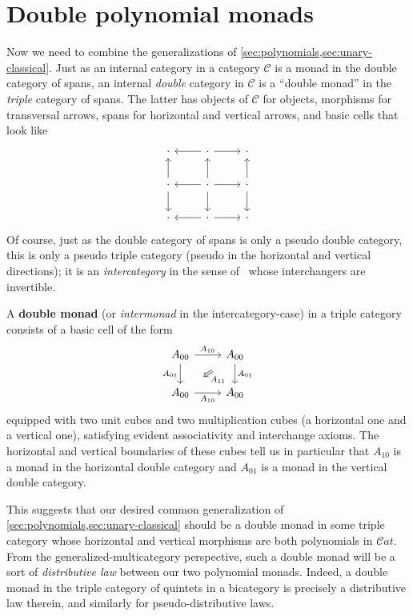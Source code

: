 \documentclass{article}
\theoremstyle{definition}
\theoremstyle{remark}
\def\Cat{\mathcal{C}\mathit{at}}
\def\sC{\mathscr{C}}
\def\twocell#1#2#3{\ar[from=#1,to=#2,phantom,""{name=1,near start},""{name=2,near end}]\ar[Rightarrow,from=1,to=2,"#3"]}
\def\drtwocell{\twocell{r}{d}}
\begin{document}
\section{Double polynomial monads}
\label{sec:double-polynomials}

Now we need to combine the generalizations of \cref{sec:polynomials,sec:unary-classical}.
Just as an internal category in a category $\sC$ is a monad in the double category of spans, an internal \emph{double} category in $\sC$ is a ``double monad'' in the \emph{triple} category of spans.
The latter has objects of $\sC$ for objects, morphisms for transversal arrows, spans for horizontal and vertical arrows, and basic cells that look like
\[
\begin{tikzcd}
  \cdot & \cdot \ar[l] \ar[r] & \cdot \\
  \cdot \ar[u] \ar[d] & \cdot \ar[u] \ar[d] \ar[r] \ar[l] & \cdot \ar[u] \ar[d]\\
  \cdot & \cdot \ar[l] \ar[r] & \cdot
\end{tikzcd}
\]
Of course, just as the double category of spans is only a pseudo double category, this is only a pseudo triple category (pseudo in the horizontal and vertical directions); it is an \emph{intercategory} in the sense of~\cite{gp:intercategories-i,gp:intercategories-ii} whose interchangers are invertible.

A \textbf{double monad} (or \emph{intermonad} in the intercategory-case) in a triple category consists of a basic cell of the form
\[
\begin{tikzcd}
  A_{00} \ar[r,"{A_{10}}"] \ar[d,swap,"{A_{01}}"] \drtwocell{A_{11}} & A_{00} \ar[d,"{A_{01}}"]\\
  A_{00} \ar[r,swap,"{A_{10}}"] & A_{00}
\end{tikzcd}
\]
equipped with two unit cubes and two multiplication cubes (a horizontal one and a vertical one), satisfying evident associativity and interchange axioms.
The horizontal and vertical boundaries of these cubes tell us in particular that $A_{10}$ is a monad in the horizontal double category and $A_{01}$ is a monad in the vertical double category.

This suggests that our desired common generalization of \cref{sec:polynomials,sec:unary-classical} should be a double monad in some triple category whose horizontal and vertical morphisms are both polynomials in $\Cat$.
From the generalized-multicategory perspective, such a double monad will be a sort of \emph{distributive law} between our two polynomial monads.
Indeed, a double monad in the triple category of quintets in a bicategory is precisely a distributive law therein, and similarly for pseudo-distributive laws.
\end{document}
